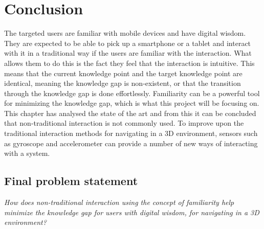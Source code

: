 \section{Conclusion}
The targeted users are familiar with mobile devices and have digital wisdom. They are expected to be able to pick up a smartphone or a tablet and interact with it in a traditional way if the users are familiar with the interaction. What allows them to do this is the fact they feel that the interaction is intuitive. This means that the current knowledge point and the target knowledge point are identical, meaning the knowledge gap is non-existent, or that the transition through the knowledge gap is done effortlessly. Familiarity can be a powerful tool for minimizing the knowledge gap, which is what this project will be focusing on. This chapter has  analysed the state of the art and from this it can be concluded that non-traditional interaction is not commonly used. To improve upon the traditional interaction methods for navigating in a 3D environment, sensors such as gyroscope and accelerometer can provide a number of new ways of interacting with a system. 

\subsection{Final problem statement}
\textit{How does non-traditional interaction using the concept of familiarity help minimize the knowledge gap for users with digital wisdom, for navigating in a 3D environment?}